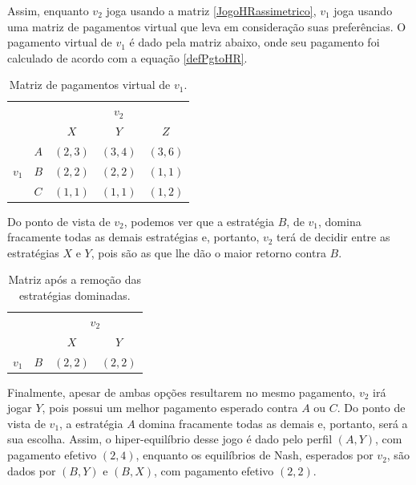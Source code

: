 Assim, enquanto $v_2$ joga usando a matriz \eqref{JogoHRassimetrico}, $v_1$ joga usando uma matriz de pagamentos virtual que leva em consideração suas preferências. O pagamento virtual de $v_1$ é dado pela matriz abaixo, onde seu pagamento foi calculado de acordo com a equação \eqref{defPgtoHR}.

\begin{table}[h]
\begin{center}
    \begin{tabular}{ccccc}
        & & \multicolumn{3}{c}{$v_2$} \\
        & & $X$ & $Y$ & $Z$ \\ \cline{3-5} 
        \multirow{3}{*}{$v_1$} & \multicolumn{1}{c|}{$A$} & \multicolumn{1}{l|}{$(2,3)$} & \multicolumn{1}{l|}{$(3,4)$} & \multicolumn{1}{l|}{$(3,6)$} \\ \cline{3-5} 
        & \multicolumn{1}{c|}{$B$} & \multicolumn{1}{l|}{$(2,2)$}  & \multicolumn{1}{l|}{$(2,2)$} & \multicolumn{1}{l|}{$(1,1)$}  \\ \cline{3-5} 
        & \multicolumn{1}{l|}{$C$} & \multicolumn{1}{l|}{$(1,1)$}  & \multicolumn{1}{l|}{$(1,1)$} & \multicolumn{1}{l|}{$(1,2)$} \\ \cline{3-5} 
    \end{tabular}
    \caption{Matriz de pagamentos virtual de $v_1$.}
    \label{PagVirtualV1}
\end{center}
\end{table}

Do ponto de vista de $v_2$, podemos ver que a estratégia $B$, de $v_1$, domina fracamente todas as demais estratégias e, portanto, $v_2$ terá de decidir entre as estratégias $X$ e $Y$, pois são as que lhe dão o maior retorno contra $B$.

\begin{table}[h]
\begin{center}
    \begin{tabular}{cccc}
        & & \multicolumn{2}{c}{$v_2$} \\
        & & $X$ & $Y$ \\ \cline{3-4} 
        $v_1$ & \multicolumn{1}{c|}{$B$} & \multicolumn{1}{l|}{$(2,2)$}  & \multicolumn{1}{l|}{$(2,2)$}  \\ \cline{3-4} 
    \end{tabular}
    \caption{Matriz após a remoção das estratégias dominadas.}
\end{center}
\end{table}

Finalmente, apesar de ambas opções resultarem no mesmo pagamento, $v_2$ irá jogar $Y$, pois possui um melhor pagamento esperado contra $A$ ou $C$. Do ponto de vista de $v_1$, a estratégia $A$ domina fracamente todas as demais e, portanto, será a sua escolha. Assim, o hiper-equilíbrio desse jogo é dado pelo perfil $(A,Y)$, com pagamento efetivo $(2,4)$, enquanto os equilíbrios de Nash, esperados por $v_2$, são dados por $(B,Y)$ e $(B,X)$, com pagamento efetivo $(2,2)$.

